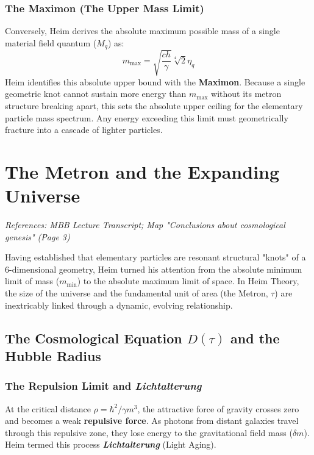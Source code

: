 \documentclass[11pt,a4paper,oneside]{article}
\begin{document}
\subsubsection{The Maximon (The Upper Mass Limit)}
Conversely, Heim derives the absolute maximum possible mass of a single material field quantum ($M_q$) as:
\begin{equation}
    m_{\max} = \sqrt{\frac{c h}{\gamma}} \sqrt[4]{2} \eta_q
\end{equation}
Heim identifies this absolute upper bound with the \textbf{Maximon}. Because a single geometric knot cannot sustain more energy than $m_{\max}$ without its metron structure breaking apart, this sets the absolute upper ceiling for the elementary particle mass spectrum. Any energy exceeding this limit must geometrically fracture into a cascade of lighter particles.
\section{The Metron and the Expanding Universe}
\label{sec:cosmology}

\textit{References: MBB Lecture Transcript; Map "Conclusions about cosmological genesis" (Page 3)}

Having established that elementary particles are resonant structural "knots" of a 6-dimensional geometry, Heim turned his attention from the absolute minimum limit of mass ($m_{\min}$) to the absolute maximum limit of space. In Heim Theory, the size of the universe and the fundamental unit of area (the Metron, $\tau$) are inextricably linked through a dynamic, evolving relationship.

\subsection{The Cosmological Equation \texorpdfstring{$D(\tau)$}{D(tau)} and the Hubble Radius}

\subsubsection{The Repulsion Limit and \textit{Lichtalterung}}
At the critical distance $\rho = \hbar^2 / \gamma m^3$, the attractive force of gravity crosses zero and becomes a weak \textbf{repulsive force}. As photons from distant galaxies travel through this repulsive zone, they lose energy to the gravitational field mass ($\delta m$). Heim termed this process \textbf{\textit{Lichtalterung}} (Light Aging). 
\end{document}
